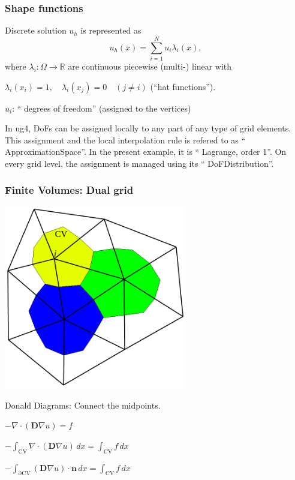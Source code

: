 \begin {frame} [t]
\frametitle {Shape functions}
Discrete solution $u_h$ is represented as
$$
 u_h (x) = \sum_{i = 1}^{N} u_i \lambda_i (x),
$$
where $\lambda_i: \Omega \to \mathbb{R}$ are continuous piecewise (multi-) linear with
\centerline {$\lambda_i (x_i) = 1, \quad \lambda_i (x_j) = 0 \quad (j \ne i)$ (``hat functions'').}

\pause
\vspace {2ex}
\centerline {$u_i$: ``{\color{blue} degrees of freedom}'' (assigned to the {\color{blue} vertices})}

\pause
\vspace {2ex}
In ug4, DoFs can be assigned locally to any part of any type of grid elements. This assignment
and the local interpolation rule is refered to as ``{\color{blue} ApproximationSpace}''.
In the present example, it is ``{\color{blue} Lagrange, order 1}''. On every grid level,
the assignment is managed using its ``{\color{blue} DoFDistribution}''.
\end {frame}

\begin {frame} [t]
\frametitle{Finite Volumes: Dual grid}
\centerline{\includegraphics [width=0.6\textwidth] {FV-Elem-Donald-Scheme.pdf}}
{%
\centerline{Donald Diagrams: Connect the midpoints.}
}%
{%
\centerline {$\displaystyle - \nabla \cdot (\mathbf{D} \nabla u) = f$}
}%
{%
\centerline {$\displaystyle - \int_{\mathrm{CV}} \nabla \cdot (\mathbf{D} \nabla u) \, dx = \int_{\mathrm{CV}} f \, dx$}
}%
{%
\centerline {$\displaystyle - \int_{\mathrm{\partial CV}} (\mathbf{D} \nabla u) \cdot \mathbf{n} \, dx = \int_{\mathrm{CV}} f \, dx$}
}%
\end {frame}

